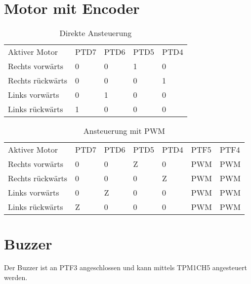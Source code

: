 \documentclass[a4paper,10pt,fleqn]{article}
\begin{document}
\section{Motor mit Encoder}
\begin{table}[h!]
\begin{tabular}{lllll}
\rowcolor{white} Aktiver Motor      & PTD7  & PTD6  & PTD5  & PTD4  \\
\rowcolor{lgray} Rechts vorwärts    & 0     & 0     & 1     & 0     \\
\rowcolor{white} Rechts rückwärts   & 0     & 0     & 0     & 1     \\
\rowcolor{lgray} Links vorwärts     & 0     & 1     & 0     & 0     \\
\rowcolor{white} Links rückwärts    & 1     & 0     & 0     & 0     \\
\end{tabular}
\caption{Direkte Ansteuerung}
\end{table}
\begin{table}[h!]
\begin{tabular}{lllllll}
\rowcolor{white} Aktiver Motor      & PTD7  & PTD6  & PTD5  & PTD4  & PTF5  & PTF4  \\
\rowcolor{lgray} Rechts vorwärts    & 0     & 0     & Z     & 0     & PWM   & PWM   \\
\rowcolor{white} Rechts rückwärts   & 0     & 0     & 0     & Z     & PWM   & PWM   \\
\rowcolor{lgray} Links vorwärts     & 0     & Z     & 0     & 0     & PWM   & PWM   \\
\rowcolor{white} Links rückwärts    & Z     & 0     & 0     & 0     & PWM   & PWM   \\
\end{tabular}
\caption{Ansteuerung mit PWM}
\end{table}

\section{Buzzer}
Der Buzzer ist an PTF3 angeschlossen und kann mittels TPM1CH5 angesteuert 
werden. 
\end{document}

